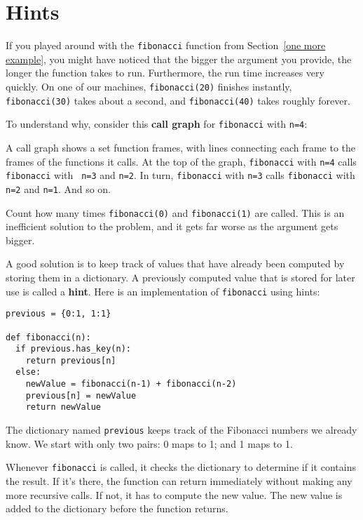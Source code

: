 \section{Hints}

If you played around with the {\tt fibonacci} function from
Section~\ref{one more example}, you might have noticed that the bigger
the argument you provide, the longer the function takes to run.
Furthermore, the run time increases very quickly.  On one of our
machines, {\tt fibonacci(20)} finishes instantly, {\tt fibonacci(30)}
takes about a second, and {\tt fibonacci(40)} takes roughly forever.

To understand why, consider this {\bf call graph} for
{\tt fibonacci} with {\tt n=4}:

\beforefig
\centerline{}
\afterfig

A call graph shows a set function frames, with lines connecting each
frame to the frames of the functions it calls.  At the top of the
graph, {\tt fibonacci} with {\tt n=4} calls {\tt fibonacci} with {\tt
n=3} and {\tt n=2}.  In turn, {\tt fibonacci} with {\tt n=3} calls
{\tt fibonacci} with {\tt n=2} and {\tt n=1}.  And so on.


Count how many times {\tt fibonacci(0)} and {\tt fibonacci(1)} are
called.  This is an inefficient solution to the problem, and it gets
far worse as the argument gets bigger.

A good solution is to keep track of values that have already been
computed by storing them in a dictionary.  A previously computed value
that is stored for later use is called a {\bf hint}.  Here is
an implementation of {\tt fibonacci} using hints:

\beforeverb
\begin{verbatim}
previous = {0:1, 1:1}

def fibonacci(n):
  if previous.has_key(n):
    return previous[n]
  else:
    newValue = fibonacci(n-1) + fibonacci(n-2)
    previous[n] = newValue
    return newValue
\end{verbatim}
\afterverb
%
The dictionary named {\tt previous} keeps track of the Fibonacci
numbers we already know.  We start with only
two pairs: 0 maps to 1; and 1 maps to 1.

Whenever {\tt fibonacci} is called, it checks the dictionary to
determine if it contains the result.
If it's there, the function can return
immediately without making any more recursive calls.  If not, it has
to compute the new value.  The new value is added to the dictionary
before the function returns.

